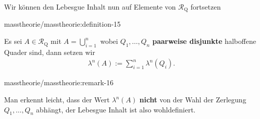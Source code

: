 \documentclass[letterpaper,10pt,english]{jupyterBook}
\begin{document}
\par
Wir können den Lebesgue Inhalt nun auf Elemente von \(\mathcal{R}_{\text{Q}}\) fortsetzen
\begin{definition}{}{masstheorie/masstheorie:definition-15}



\par
Es sei \(A\in\mathcal{R}_{\text{Q}}\) mit \(A=\bigcup_{i=1}^n\) wobei \(Q_1,\ldots,Q_n\) \textbf{paarweise disjunkte} halboffene Quader sind, dann setzen wir
\begin{align*}
\lambda^n(A):=\sum_{i=1}^{n} \lambda^n(Q_i).
\end{align*}\end{definition}
\begin{remark}{}{masstheorie/masstheorie:remark-16}



\par
Man erkennt leicht, dass der Wert \(\lambda^n(A)\) \textbf{nicht} von der Wahl der Zerlegung \(Q_1,\ldots,Q_n\) abhängt, der Lebesgue Inhalt ist also wohldefiniert.
\end{remark}
\end{document}
